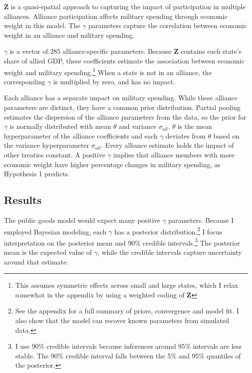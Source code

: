 \documentclass[12pt]{article}
\begin{document}
$\textbf{Z}$ is a quasi-spatial approach to capturing the impact of participation in multiple alliances.
Alliance participation affects military spending through economic weight in this model.  
The $\gamma$ parameters capture the correlation between economic weight in an alliance and military spending. 


$\gamma$ is a vector of 285 alliance-specific parameters.  
Because \textbf{Z} contains each state's share of allied GDP, these coefficients estimate the association between economic weight and military spending.\footnote{This assumes symmetric effects across small and large states, which I relax somewhat in the appendix by using a weighted coding of $\textbf{Z}$} 
When a state is not in an alliance, the corresponding $\gamma$ is multiplied by zero, and has no impact. 


Each alliance has a separate impact on military spending.
While these alliance parameters are distinct, they have a common prior distribution.
Partial pooling estimates the dispersion of the alliance parameters from the data, so the prior for $\gamma$ is normally distributed with mean $\theta$ and variance $\sigma_{all}$. 
$\theta$ is the mean hyperparameter of the alliance coefficients and each $\gamma$ deviates from $\theta$ based on the variance hyperparameter $\sigma_{all}$.
Every alliance estimate holds the impact of other treaties constant. 
A positive $\gamma$ implies that alliance members with more economic weight have higher percentage changes in military spending, as Hypothesis 1 predicts. 
    


\subsection{Results} 


The public goods model would expect many positive $\gamma$ parameters. 
Because I employed Bayesian modeling, each $\gamma$ has a posterior distribution.\footnote{See the appendix for a full summary of priors, convergence and model fit. I also show that the model can recover known parameters from simulated data.} 
I focus interpretation on the posterior mean and 90\% credible intervals.\footnote{I use 90\% credible intervals because inferences around 95\% intervals are less stable. The 90\% credible interval falls between the 5\% and 95\% quantiles of the posterior.}
The posterior mean is the expected value of $\gamma$, while the credible intervals capture uncertainty around that estimate.  
\end{document}
